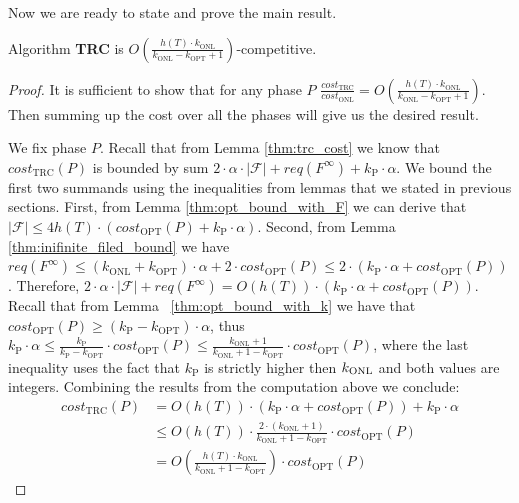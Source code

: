 Now we are ready to state and prove the main result.  
\begin{theorem} Algorithm
\textbf{TRC} is $O(\frac{h(T) \cdot k_{\mathrm{ONL}}}{k_{\mathrm{ONL}} -
k_{\mathrm{OPT}} + 1})$-competitive.
\label{thm:main_theorem}
\end{theorem}
\begin{proof} It is sufficient to show that for any phase $P$
$\frac{cost_{\mathrm{TRC}}}{cost_{\mathrm{ONL}}} = O(\frac{h(T) \cdot
k_{\mathrm{ONL}}}{k_{\mathrm{ONL}} - k_{\mathrm{OPT}} + 1})$. Then summing up
the cost over all the phases will give us the desired result.

We fix phase $P$. Recall that from Lemma \ref{thm:trc_cost} we know that
$cost_{\mathrm{TRC}}(P)$ is bounded by sum $2 \cdot \alpha \cdot |\mathcal{F}| +
req(F^{\infty}) + k_{\mathrm{P}} \cdot \alpha$. We bound the first two summands using the
inequalities from lemmas that we stated in previous sections. First, from
Lemma \ref{thm:opt_bound_with_F} we can derive that $|\mathcal{F}| \leq 4h(T)
\cdot (cost_{\mathrm{OPT}}(P) + k_{\mathrm{P}} \cdot \alpha)$. Second, from Lemma
\ref{thm:inifinite_filed_bound} we have $req(F^{\infty}) \leq (k_{\mathrm{ONL}}
+ k_{\mathrm{OPT}}) \cdot \alpha + 2 \cdot cost_{\mathrm{OPT}}(P) \leq 2 \cdot
(k_{\mathrm{P}} \cdot \alpha + cost_{\mathrm{OPT}}(P))$. Therefore, $2 \cdot \alpha \cdot
|\mathcal{F}| + req(F^{\infty}) = O(h(T)) \cdot (k_{\mathrm{P}} \cdot \alpha +
cost_{\mathrm{OPT}}(P))$. Recall that from Lemma ~\ref{thm:opt_bound_with_k}
we have that $cost_{\mathrm{OPT}}(P) \geq (k_{\mathrm{P}} - k_{\mathrm{OPT}}) \cdot \alpha$, thus $k_{\mathrm{P}} \cdot \alpha \leq
\frac{k_{\mathrm{P}}}{k_{\mathrm{P}} - k_{\mathrm{OPT}}} \cdot
cost_{\mathrm{OPT}}(P) \leq \frac{k_{\mathrm{ONL}} + 1}{k_{\mathrm{ONL}} + 1 -
k_{\mathrm{OPT}}} \cdot cost_{\mathrm{OPT}}(P)$, where the last inequality uses the fact that
$k_{\mathrm{P}}$ is strictly higher then $k_{\mathrm{ONL}}$ and both values are
integers. Combining the results from the computation above we conclude:
\begin{equation*}
\begin{split}
cost_{\mathrm{TRC}}(P) & =  O(h(T)) \cdot (k_{\mathrm{P}} \cdot \alpha +
cost_{\mathrm{OPT}}(P)) + k_{\mathrm{P}} \cdot \alpha \\
& \leq O(h(T)) \cdot \frac{2 \cdot(k_{\mathrm{ONL}} + 1)}{k_{\mathrm{ONL}} + 1 -
k_{\mathrm{OPT}}} \cdot cost_{\mathrm{OPT}}(P) \\
& = O(\frac{h(T) \cdot k_{\mathrm{ONL}}}{k_{\mathrm{ONL}} + 1 -
k_{\mathrm{OPT}}}) \cdot cost_{\mathrm{OPT}}(P)
\end{split}
\end{equation*}  
\end{proof}

